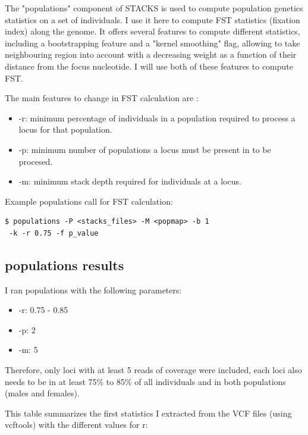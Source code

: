 \documentclass[10pt,a4paper]{report}
\begin{document}
The "populations" component of STACKS is used to compute population genetics statistics on a set of individuals. I use it here to compute FST statistics (fixation index) along the genome. It offers several features to compute different statistics, including a bootstrapping feature and a "kernel smoothing" flag, allowing to take neighbouring region into account with a decreasing weight as a function of their distance from the focus nucleotide. I will use both of these features to compute FST.

The main features to change in FST calculation are :
\begin{itemize}
\item -r: minimum percentage of individuals in a population required to process a locus for that population.
\item -p: minimum number of populations a locus must be present in to be procesed.
\item -m: minimum stack depth required for individuals at a locus.
\end{itemize}

Example populations call for FST calculation:
\begin{lstlisting}
$ populations -P <stacks_files> -M <popmap> -b 1
 -k -r 0.75 -f p_value
\end{lstlisting}

\subsection{populations results}

I ran populations with the following parameters:
\begin{itemize}
\item -r: 0.75 - 0.85
\item -p: 2
\item -m: 5
\end{itemize}

Therefore, only loci with at least 5 reads of coverage were included, each loci also needs to be in at least 75\% to 85\% of all individuals and in both populations (males and females).

This table summarizes the first statistics I extracted from the VCF files (using vcftools) with the different values for r:
\begin{center}
\vspace{10px}
\vspace{10px}
\end{center}
\end{document}

